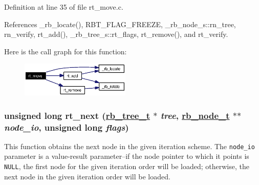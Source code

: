 Definition at line 35 of file rt\_\-move.c.

References \_\-rb\_\-locate(), RBT\_\-FLAG\_\-FREEZE, \_\-rb\_\-node\_\-s::rn\_\-tree, rn\_\-verify, rt\_\-add(), \_\-rb\_\-tree\_\-s::rt\_\-flags, rt\_\-remove(), and rt\_\-verify.

Here is the call graph for this function:\begin{figure}[H]
\begin{center}
\leavevmode
\includegraphics[width=148pt]{group__dbprim__rbtree_ga8_cgraph}
\end{center}
\end{figure}
\hypertarget{group__dbprim__rbtree_ga11}{
\subsubsection[rt\_\-next]{\setlength{\rightskip}{0pt plus 5cm}unsigned long rt\_\-next (\hyperlink{struct__rb__tree__s}{rb\_\-tree\_\-t} $\ast$ {\em tree}, \hyperlink{struct__rb__node__s}{rb\_\-node\_\-t} $\ast$$\ast$ {\em node\_\-io}, unsigned long {\em flags})}}
\label{group__dbprim__rbtree_ga11}


This function obtains the next node in the given iteration scheme. The {\tt node\_\-io} parameter is a value-result parameter--if the node pointer to which it points is {\tt NULL}, the first node for the given iteration order will be loaded; otherwise, the next node in the given iteration order will be loaded.

